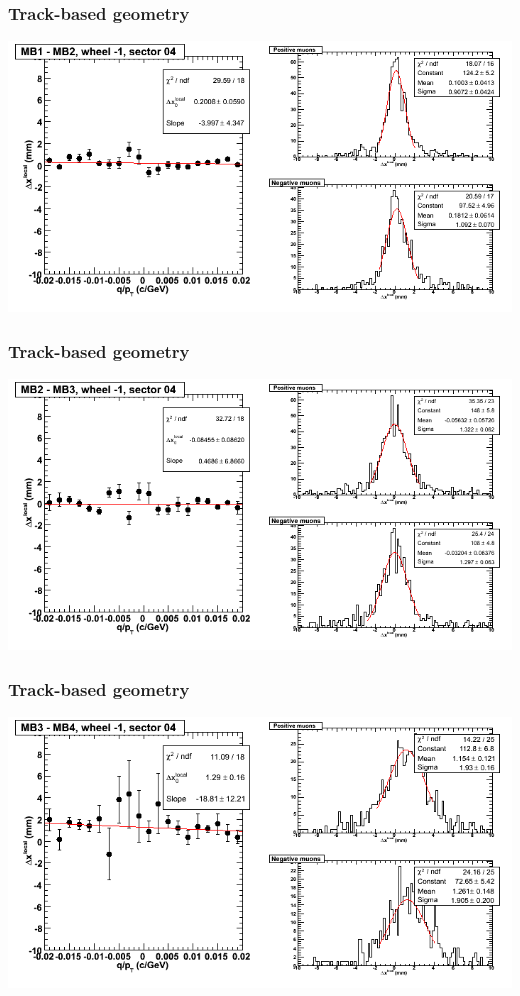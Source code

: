 \documentclass[compress]{beamer}
\begin{document}
\begin{frame}
\frametitle{Track-based geometry}
\includegraphics[width=\linewidth]{NOV4_segdiffs/dt13_resid_B_04_12.png}
\end{frame}

\begin{frame}
\frametitle{Track-based geometry}
\includegraphics[width=\linewidth]{NOV4_segdiffs/dt13_resid_B_04_23.png}
\end{frame}

\begin{frame}
\frametitle{Track-based geometry}
\includegraphics[width=\linewidth]{NOV4_segdiffs/dt13_resid_B_04_34.png}
\end{frame}
\end{document}
